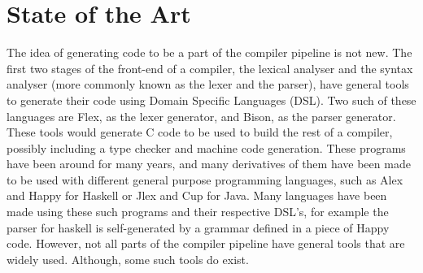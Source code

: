 \chapter{State of the Art}

The idea of generating code to be a part of the compiler pipeline is not new.
The first two stages of the front-end of a compiler, the lexical analyser and the syntax analyser (more commonly known as the lexer and the parser), have general tools to generate their code using Domain Specific Languages (DSL)\cite{Bentley:1986:PPL:6424.315691,van2000domain}.
Two such of these languages are Flex, as the lexer generator, and Bison, as the parser generator.
These tools would generate C code to be used to build the rest of a compiler, possibly including a type checker and machine code generation.
These programs have been around for many years, and many derivatives of them have been made to be used with different general purpose programming languages, such as Alex and Happy for Haskell or Jlex and Cup for Java\cite{ranta2012implementing}.
Many languages have been made using these such programs and their respective DSL's, for example the parser for haskell is self-generated by a grammar defined in a piece of Happy code.
However, not all parts of the compiler pipeline have general tools that are widely used.
Although, some such tools do exist\cite{grimm2007typical,ruler}.



